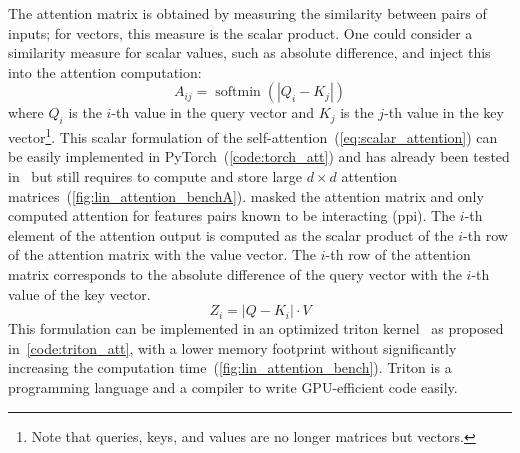 \documentclass[../main.tex]{subfiles}
\begin{document}
		The attention matrix is obtained by measuring the similarity between pairs of inputs; for vectors, this measure is the scalar product.
		One could consider a similarity measure for scalar values, such as absolute difference, and inject this into the attention computation:
		\begin{equation}
			A_{ij} = \operatorname{softmin}\left(\left|Q_{i} - K_{j} \right| \right) \label{eq:scalar_attention}
		\end{equation}
		where \(Q_{i}\) is the \(i\)-th value in the query vector and \(K_{j}\) is the \(j\)-th value in the key vector\footnote{Note that queries, keys, and values are no longer matrices but vectors.}.
		This scalar formulation of the self-attention~(\cref{eq:scalar_attention}) can be easily implemented in PyTorch~(\cref{code:torch_att}) and has already been tested in~\cite{Lacan2023} but still requires to compute and store large \(d\times d\) attention matrices~(\cref{fig:lin_attention_benchA}).
		\citeauthor{Lacan2023} masked the attention matrix and only computed attention for features pairs known to be interacting (\gls{ppi})\cite{Lacan2023}.
		The \(i\)-th element of the attention output is computed as the scalar product of the \(i\)-th row of the attention matrix with the value vector.
		The \(i\)-th row of the attention matrix corresponds to the absolute difference of the query vector with the \(i\)-th value of the key vector.
		\begin{equation}
			Z_{i} = \left| Q - K_{i} \right| \cdot V
		\end{equation}
		This formulation can be implemented in an optimized triton kernel~\cite{TritonLang} as proposed in~\cref{code:triton_att}, with a lower memory footprint without significantly increasing the computation time~(\cref{fig:lin_attention_bench}).
		Triton is a programming language and a compiler to write GPU-efficient code easily.
\end{document}
